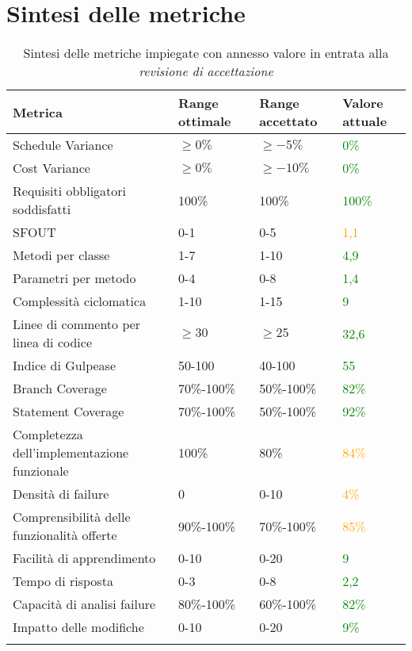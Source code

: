 \section{Sintesi delle metriche}
\label{metr}
\begin{longtable}[H]{|C{5cm}|C{3.5cm}|C{3.5cm}|C{3.5cm}|}
	    \hline
		\textbf{Metrica} & \textbf{Range ottimale} & \textbf{Range accettato} & \textbf{Valore attuale} \\ \hline
		Schedule Variance & $\geq0\%$ & $\geq-5\%$ & \textcolor{green}{0\%} \\ \hline
		Cost Variance & $\geq0\%$ & $\geq-10\%$ & \textcolor{green}{0\%} \\ \hline
		Requisiti obbligatori soddisfatti & 100\% & 100\% & \textcolor{green}{100\%} \\ \hline
		SFOUT & 0-1 & 0-5  & \textcolor{orange}{1,1} \\ \hline
		Metodi per classe & 1-7 & 1-10 & \textcolor{green}{4,9} \\ \hline
		Parametri per metodo & 0-4 & 0-8 & \textcolor{green}{1,4} \\ \hline
		Complessità ciclomatica & 1-10 & 1-15 & \textcolor{green}{9} \\ \hline
		Linee di commento per linea di codice & $\geq30$ & $\geq25$ & \textcolor{green}{32,6} \\ \hline
		Indice di Gulpease & 50-100 & 40-100 & \textcolor{green}{55} \\ \hline
		Branch Coverage & 70\%-100\% & 50\%-100\% & \textcolor{green}{82\%} \\ \hline
		Statement Coverage & 70\%-100\% & 50\%-100\% & \textcolor{green}{92\%} \\ \hline
		Completezza dell'implementazione funzionale & 100\% & 80\% & \textcolor{orange}{84\%} \\ \hline
		Densità di failure & 0 & 0-10 & \textcolor{orange}{4\%} \\ \hline
		Comprensibilità delle funzionalità offerte & 90\%-100\% & 70\%-100\% & \textcolor{orange}{85\%} \\ \hline
		Facilità di apprendimento & 0-10 & 0-20 & \textcolor{green}{9}\\ \hline
		Tempo di risposta & 0-3 & 0-8 & \textcolor{green}{2,2} \\ \hline
		Capacità di analisi failure & 80\%-100\% & 60\%-100\% & \textcolor{green}{82\%} \\ \hline
		Impatto delle modifiche & 0-10 & 0-20 & \textcolor{green}{9\%} \\ \hline
		\caption{Sintesi delle metriche impiegate con annesso valore in entrata alla \emph{revisione di accettazione} }
\end{longtable}
